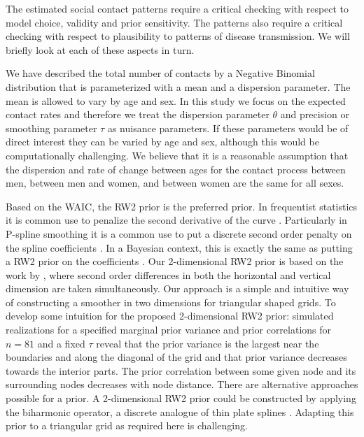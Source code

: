 \documentclass[aoas,preprint]{imsart}
\numberwithin{equation}{section}
\begin{document}
The estimated social contact patterns require a critical checking with respect to model choice, validity and prior sensitivity. The patterns also require a critical checking with respect to plausibility to patterns of disease transmission. We will briefly look at each of these aspects in turn.

We have described the total number of contacts by a Negative Binomial distribution that is parameterized with a mean and a dispersion parameter. The mean is allowed to vary by age and sex. In this study we focus on the expected contact rates and therefore we treat the dispersion parameter $\theta$ and precision or smoothing parameter $\tau$ as nuisance parameters. If these parameters would be of direct interest they can be varied by age and sex, although this would be computationally challenging. We believe that it is a reasonable assumption that the dispersion and rate of change between ages for the contact process between men, between men and women, and between women are the same for all sexes.

Based on the WAIC, the RW2 prior is the preferred prior. In frequentist statistics it is common use to penalize the second derivative of the curve \citep{wood_generalized_2006}. Particularly in P-spline smoothing it is a common use to put a discrete second order penalty on the spline coefficients \citep{eilers_flexible_1996}. In a Bayesian context, this is exactly the same as putting a RW2 prior on the coefficients \citep{lang_bayesian_2004}. Our 2-dimensional RW2 prior is based on the work by \cite{currie_smoothing_2004}, where second order differences in both the horizontal and vertical dimension are taken simultaneously. Our approach is a simple and intuitive way of constructing a smoother in two dimensions for triangular shaped grids. To develop some intuition for the proposed 2-dimensional RW2 prior: simulated realizations for a specified marginal prior variance and prior correlations for $n = 81$ and a fixed $\tau$ reveal that the prior variance is the largest near the boundaries and along the diagonal of the grid and that prior variance decreases towards the interior parts. The prior correlation between some given node and its surrounding nodes decreases with node distance. There are alternative approaches possible for a prior. A 2-dimensional RW2 prior could be constructed by applying the biharmonic operator, a discrete analogue of thin plate splines \citep{rue_gaussian_2005}. Adapting this prior to a triangular grid as required here is challenging.
\end{document}
